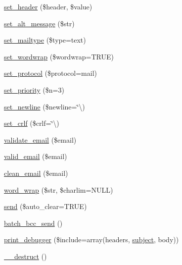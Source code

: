 \begin{DoxyCompactItemize}
\mbox{\hyperlink{class_c_i___email_aff40701d50f18c87942be79f8b447247}{set\+\_\+header}} (\$header, \$value)
\item 
\mbox{\hyperlink{class_c_i___email_a18f0b650e6e9a859e1936a41e86fb3a6}{set\+\_\+alt\+\_\+message}} (\$str)
\item 
\mbox{\hyperlink{class_c_i___email_a9baeadff990ea673d75c3019c8cc3524}{set\+\_\+mailtype}} (\$type=\textquotesingle{}text\textquotesingle{})
\item 
\mbox{\hyperlink{class_c_i___email_a6abb8d5f17213eba1e243ca633da8084}{set\+\_\+wordwrap}} (\$wordwrap=T\+R\+UE)
\item 
\mbox{\hyperlink{class_c_i___email_a7be40507898a21ce9172b225e973b107}{set\+\_\+protocol}} (\$protocol=\textquotesingle{}mail\textquotesingle{})
\item 
\mbox{\hyperlink{class_c_i___email_aee3ae37c0bf5f8aca34f6e872efd66b8}{set\+\_\+priority}} (\$n=3)
\item 
\mbox{\hyperlink{class_c_i___email_aa8661a0f33afb4df33d4f6f935b36a49}{set\+\_\+newline}} (\$newline=\char`\"{}\textbackslash{})
\item 
\mbox{\hyperlink{class_c_i___email_a85c81ed9eb7f4af42e69a07c6c6805d0}{set\+\_\+crlf}} (\$crlf=\char`\"{}\textbackslash{})
\item 
\mbox{\hyperlink{class_c_i___email_a1907f0dba44e2968b8260dbc5770550f}{validate\+\_\+email}} (\$email)
\item 
\mbox{\hyperlink{class_c_i___email_abe07a23d74d453da8fb639b5c3951873}{valid\+\_\+email}} (\$email)
\item 
\mbox{\hyperlink{class_c_i___email_ab8139994bc1b1bee3d2750b627cdd0c6}{clean\+\_\+email}} (\$email)
\item 
\mbox{\hyperlink{class_c_i___email_aa3a2a5440115b320a0c2fcea542e546a}{word\+\_\+wrap}} (\$str, \$charlim=N\+U\+LL)
\item 
\mbox{\hyperlink{class_c_i___email_a547a65a81ba2d1f98cc15121a45dab11}{send}} (\$auto\+\_\+clear=T\+R\+UE)
\item 
\mbox{\hyperlink{class_c_i___email_a889f14cabfcfe05b5c0d0dbbb8f557e0}{batch\+\_\+bcc\+\_\+send}} ()
\item 
\mbox{\hyperlink{class_c_i___email_a11f22e40cb1409ee7569c0abc15fae09}{print\+\_\+debugger}} (\$include=array(\textquotesingle{}headers\textquotesingle{}, \textquotesingle{}\mbox{\hyperlink{class_c_i___email_aaa61b3aaa6cc4c90e26686e4bf41587a}{subject}}\textquotesingle{}, \textquotesingle{}body\textquotesingle{}))
\item 
\mbox{\hyperlink{class_c_i___email_a421831a265621325e1fdd19aace0c758}{\+\_\+\+\_\+destruct}} ()
\end{DoxyCompactItemize}

